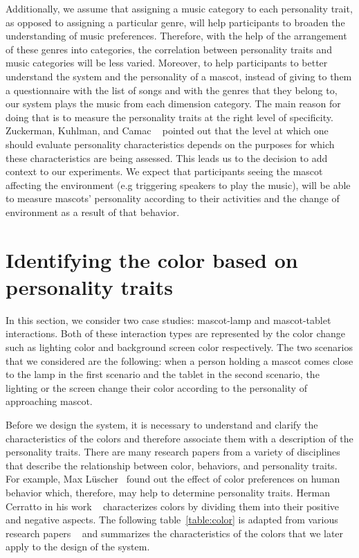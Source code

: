Additionally, we assume that assigning a music category to each personality trait,
as opposed to assigning a particular genre, will help participants to broaden the understanding of music preferences.
Therefore, with the help of the arrangement of these genres into categories,
the correlation between personality traits and music categories will be less varied.
Moreover, to help participants to better understand the system and the personality of a mascot,
instead of giving to them a questionnaire with the list of songs and with the genres that they
belong to, our system plays the music from each dimension category.
The main reason for doing that is to measure the personality traits at the right level of specificity.
Zuckerman, Kuhlman, and Camac ~\cite{zuckerman1988lies} pointed out that the level at which one
should evaluate personality characteristics depends on the purposes for which these characteristics are being assessed.
This leads us to the decision to add context to our experiments.
We expect that participants seeing the mascot affecting the environment
(e.g triggering speakers to play the music), will be able to measure mascots'
personality according to their activities and the change of environment as a result of that behavior.

\section{Identifying the color based on personality traits}
\label{sec:Identifying the color based on personality traits}

In this section, we consider two case studies: mascot-lamp and mascot-tablet interactions.
Both of these interaction types are represented by the color change such as
lighting color and background screen color respectively.
The two scenarios that we considered are the following: when a person holding a mascot comes close
to the lamp in the first scenario and the tablet in the second scenario, the lighting
or the screen change their color according to the personality of approaching mascot.

Before we design the system, it is necessary to understand and clarify the characteristics
of the colors and therefore associate them with a description of the personality traits.
There are many research papers from a variety of disciplines that describe the
relationship between color, behaviors, and personality traits.
For example, Max Lüscher~\cite{luscher1971luscher} found out the effect of
color preferences on human behavior which, therefore, may help to determine personality traits.
Herman Cerratto in his work ~\cite{cerrato2012meaning} characterizes colors by
dividing them into their positive and negative aspects.
The following table~\ref{table:color} is adapted from various research
papers ~\cite{luscher1971luscher,cerrato2012meaning,schaie1964color} and
summarizes the characteristics of the colors that we later apply to the design of the system.

